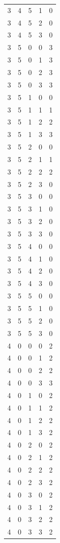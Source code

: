 \begin{longtable}{rrrrr}
3 & 4 & 5 & 1 & 0 \\
3 & 4 & 5 & 2 & 0 \\
3 & 4 & 5 & 3 & 0 \\
3 & 5 & 0 & 0 & 3 \\
3 & 5 & 0 & 1 & 3 \\
3 & 5 & 0 & 2 & 3 \\
3 & 5 & 0 & 3 & 3 \\
3 & 5 & 1 & 0 & 0 \\
3 & 5 & 1 & 1 & 1 \\
3 & 5 & 1 & 2 & 2 \\
3 & 5 & 1 & 3 & 3 \\
3 & 5 & 2 & 0 & 0 \\
3 & 5 & 2 & 1 & 1 \\
3 & 5 & 2 & 2 & 2 \\
3 & 5 & 2 & 3 & 0 \\
3 & 5 & 3 & 0 & 0 \\
3 & 5 & 3 & 1 & 0 \\
3 & 5 & 3 & 2 & 0 \\
3 & 5 & 3 & 3 & 0 \\
3 & 5 & 4 & 0 & 0 \\
3 & 5 & 4 & 1 & 0 \\
3 & 5 & 4 & 2 & 0 \\
3 & 5 & 4 & 3 & 0 \\
3 & 5 & 5 & 0 & 0 \\
3 & 5 & 5 & 1 & 0 \\
3 & 5 & 5 & 2 & 0 \\
3 & 5 & 5 & 3 & 0 \\
4 & 0 & 0 & 0 & 2 \\
4 & 0 & 0 & 1 & 2 \\
4 & 0 & 0 & 2 & 2 \\
4 & 0 & 0 & 3 & 3 \\
4 & 0 & 1 & 0 & 2 \\
4 & 0 & 1 & 1 & 2 \\
4 & 0 & 1 & 2 & 2 \\
4 & 0 & 1 & 3 & 2 \\
4 & 0 & 2 & 0 & 2 \\
4 & 0 & 2 & 1 & 2 \\
4 & 0 & 2 & 2 & 2 \\
4 & 0 & 2 & 3 & 2 \\
4 & 0 & 3 & 0 & 2 \\
4 & 0 & 3 & 1 & 2 \\
4 & 0 & 3 & 2 & 2 \\
4 & 0 & 3 & 3 & 2 \\

\end{longtable}
